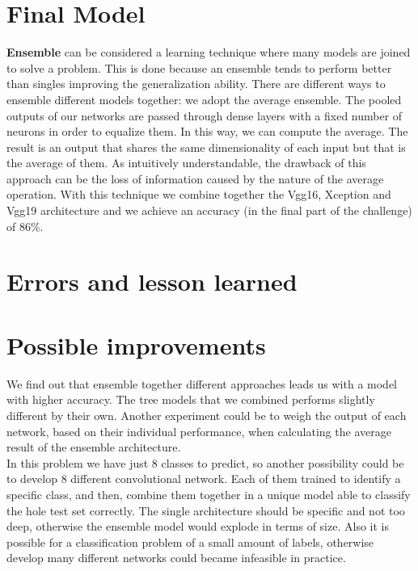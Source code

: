 \documentclass[11pt, oneside]{article}
\begin{document}

\section{Final Model}
\textbf{Ensemble} can be considered a learning technique where many models are joined to solve a problem. This is done because an ensemble tends to perform better than singles improving the generalization ability. There are different ways to ensemble different models together: we adopt the average ensemble. The pooled outputs of our networks are passed through dense layers with a fixed number of neurons in order to equalize them. In this way, we can compute the average. The result is an output that shares the same dimensionality of each input but that is the average of them. As intuitively understandable, the drawback of this approach can be the loss of information caused by the nature of the average operation. With this technique we combine together the Vgg16, Xception and Vgg19 architecture and we achieve an accuracy (in the final part of the challenge) of 86\%.

\section{Errors and lesson learned}
\section{Possible improvements}
We find out that ensemble together different approaches leads us with a model with higher accuracy. The tree models that we combined performs slightly different by their own. Another experiment could be to weigh the output of each network, based on their individual performance, when calculating the average result of the ensemble architecture.\\
In this problem we have just 8 classes to predict, so another possibility could be to develop 8 different convolutional network. Each of them trained to identify a specific class, and then, combine them together in a unique model able to classify the hole test set correctly. The single architecture should be specific and not too deep, otherwise the ensemble model would explode in terms of size. Also it is possible for a classification problem of a small amount of labels, otherwise develop many different networks could became infeasible in practice.
\end{document}
